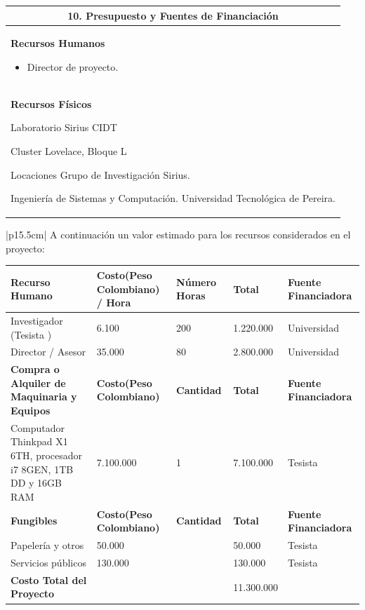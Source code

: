 \documentclass[letter,12pt]{article}
\begin{document}
\begin{center}
\begin{tabular}{|p{15.5cm}|}
\hline
\multicolumn{1}{|c|}{ \textbf{10. Presupuesto y Fuentes de Financiación}}\\
\hline

\textbf{Recursos Humanos}
\begin{itemize}
    \item Director de proyecto.
\end{itemize}\\
\textbf{Recursos Físicos}
\item Laboratorio Sirius CIDT
    \item Cluster Lovelace, Bloque L
    \item Locaciones Grupo de Investigación Sirius. \par
    Ingeniería de Sistemas y Computación. Universidad Tecnológica de Pereira.

\hline
\end{tabular}
\end{center}
\begin{center}
\begin{tabular}{|p{15.5cm}|}
\hline
	A continuación un valor estimado para los recursos considerados en el proyecto:
	\begin{center}
    \begin{tabular}{|p{2.5cm}|p{3cm}|p{2cm}|p{2cm}|p{3cm}|}
    \hline
    \textbf{Recurso Humano} & \textbf{Costo(Peso Colombiano) / Hora } & \textbf{Número Horas} & \textbf{Total} & \textbf{Fuente Financiadora} \\
    \hline
    Investigador (Tesista   ) & 6.100 & 200 & 1.220.000 & Universidad \\
    \hline    \hline
    Director / Asesor & 35.000 & 80 & 2.800.000 & Universidad \\
    \hline
    \textbf{Compra o Alquiler de Maquinaria y Equipos} & \textbf{Costo(Peso Colombiano) } & \textbf{Cantidad} & \textbf{Total} & \textbf{Fuente Financiadora} \\
    \hline
    Computador Thinkpad X1 6TH, procesador i7 8GEN, 1TB DD y 16GB RAM & 7.100.000 & 1 & 7.100.000 & Tesista  \\
    \hline

    \textbf{Fungibles} & \textbf{Costo(Peso Colombiano) } & \textbf{Cantidad} & \textbf{Total} & \textbf{Fuente Financiadora} \\
    \hline
    Papelería y otros & 50.000 &  & 50.000 & Tesista \\
    \hline
    Servicios públicos & 130.000 &  & 130.000 & Tesista  \\
    \hline
    \textbf{Costo Total del Proyecto} &  &  & 11.300.000 &  \\
    \hline
    \end{tabular}
    \end{center}\\
\hline
\end{tabular}
\end{center}
\end{document}
